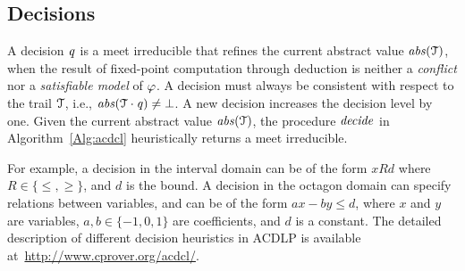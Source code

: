 \subsection{Decisions}\label{sec:decide}
%
A decision $\mathit{q}$ is a meet irreducible that refines the
current abstract value $\mathit{abs}(\mathcal{T})$, when the result of fixed-point 
computation through deduction is neither a {\em conflict} nor a {\em 
satisfiable model} 
of $\varphi$.  A decision must always be consistent 
with respect to the trail $\mathcal{T}$, 
i.e., $\mathit{abs}(\mathcal{T}\cdot \mathit{q})\neq \bot$.  A new 
decision increases the decision level by one. Given the 
current abstract value $\mathit{abs}(\mathcal{T})$, the procedure $\mathit{decide}$ 
in Algorithm~\ref{Alg:acdcl} heuristically returns a meet irreducible.


%
For example, a decision in the interval domain can be of the form 
$x R d$ where $R \in \{\leq,\allowbreak\geq\}$, and $d$ 
is the bound.  A decision in the octagon domain can specify relations 
between variables, and can be of the form $ax - by \leq d$, where 
$x$ and $y$ are variables, $a,b \in \{-1,0,1\}$ are coefficients, 
and $d$ is a constant.  The detailed description of different 
decision heuristics in ACDLP is available at~\url{http://www.cprover.org/acdcl/}.

%

%

